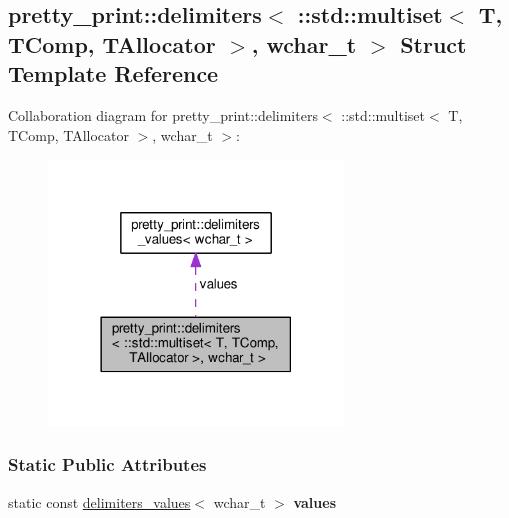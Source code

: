 \hypertarget{structpretty__print_1_1delimiters_3_01_1_1std_1_1multiset_3_01T_00_01TComp_00_01TAllocator_01_4_00_01wchar__t_01_4}{}\subsection{pretty\+\_\+print\+:\+:delimiters$<$ \+:\+:std\+:\+:multiset$<$ T, T\+Comp, T\+Allocator $>$, wchar\+\_\+t $>$ Struct Template Reference}
\label{structpretty__print_1_1delimiters_3_01_1_1std_1_1multiset_3_01T_00_01TComp_00_01TAllocator_01_4_00_01wchar__t_01_4}


Collaboration diagram for pretty\+\_\+print\+:\+:delimiters$<$ \+:\+:std\+:\+:multiset$<$ T, T\+Comp, T\+Allocator $>$, wchar\+\_\+t $>$\+:
\nopagebreak
\begin{figure}[H]
\begin{center}
\leavevmode
\includegraphics[width=222pt]{structpretty__print_1_1delimiters_3_01_1_1std_1_1multiset_3_01T_00_01TComp_00_01TAllocator_01_4_00_01wchar__t_01_4__coll__graph}
\end{center}
\end{figure}
\subsubsection*{Static Public Attributes}
\begin{DoxyCompactItemize}
\item 
static const \hyperlink{structpretty__print_1_1delimiters__values}{delimiters\+\_\+values}$<$ wchar\+\_\+t $>$ {\bfseries values}\hypertarget{structpretty__print_1_1delimiters_3_01_1_1std_1_1multiset_3_01T_00_01TComp_00_01TAllocator_01_4_00_01wchar__t_01_4_abbb7d39ec73b3bb1d0c513cbad4d0038}{}\label{structpretty__print_1_1delimiters_3_01_1_1std_1_1multiset_3_01T_00_01TComp_00_01TAllocator_01_4_00_01wchar__t_01_4_abbb7d39ec73b3bb1d0c513cbad4d0038}

\end{DoxyCompactItemize}


